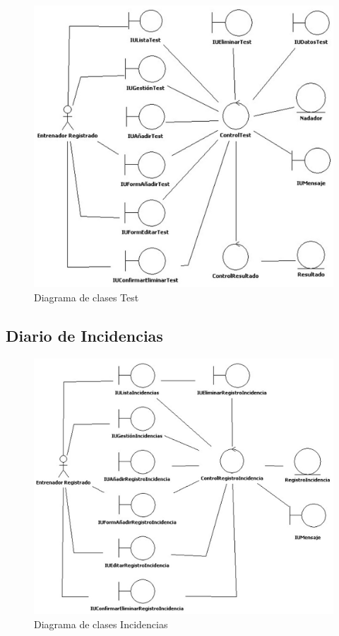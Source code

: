 			\begin{figure}[H]
			  \centering
			    \includegraphics[width=14cm]{./eps/an_diagclases/GestionTest.eps}
			  \caption{Diagrama de clases Test}
			  \label{fig:an_diagclases_test}
			\end{figure}
		
		\subsection{Diario de Incidencias} %
			\label{sub:diario_de_incidencias}
			
			\begin{figure}[H]
			  \centering
			    \includegraphics[width=14cm]{./eps/an_diagclases/GestionIncidencias.eps}
			  \caption{Diagrama de clases Incidencias}
			  \label{fig:an_diagclases_incidencias}
			\end{figure}
	
